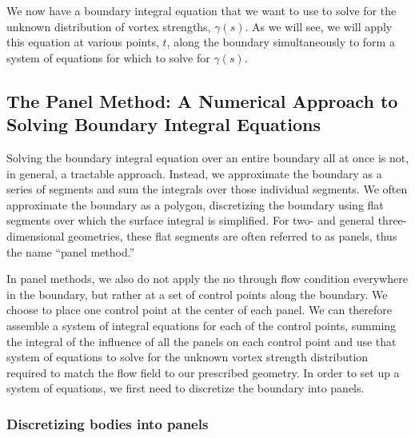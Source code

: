 We now have a boundary integral equation that we want to use to solve for the unknown distribution of vortex strengths, \(\gamma(s)\).
%
As we will see, we will apply this equation at various points, \(t\), along the boundary simultaneously to form a system of equations for which to solve for \(\gamma(s)\).


\subsection{The Panel Method: A Numerical Approach to Solving Boundary Integral Equations}
\label{ssec:panelmethodology}

Solving the boundary integral equation over an entire boundary all at once is not, in general, a tractable approach.
%
Instead, we approximate the boundary as a series of segments and sum the integrals over those individual segments.
%
We often approximate the boundary as a polygon, discretizing the boundary using flat segments over which the surface integral is simplified.
%
For two- and general three-dimensional geometries, these flat segments are often referred to as panels, thus the name ``panel method.''

In panel methods, we also do not apply the no through flow condition everywhere in the boundary, but rather at a set of control points along the boundary.
%
We choose to place one control point at the center of each panel.
%
We can therefore assemble a system of integral equations for each of the control points, summing the integral of the influence of all the panels on each control point and use that system of equations to solve for the unknown vortex strength distribution required to match the flow field to our prescribed geometry.
%
In order to set up a system of equations, we first need to discretize the boundary into panels.

\subsubsection{Discretizing bodies into panels}

\begin{assumption}{}
    \label{asm:panels}




\end{assumption}

